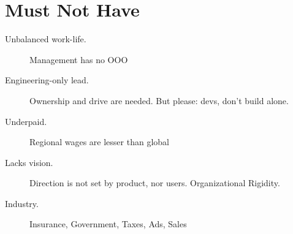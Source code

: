 \documentclass[10pt, a4paper, twocolumn]{article}
\begin{document}


\section*{Must Not Have}

\begin{description}
  \item[Unbalanced work-life.] Management has no OOO
  \item[Engineering-only lead.]
  Ownership and drive are needed.
  But please: %
  devs, don't build alone.
 \item[Underpaid.] Regional wages are lesser than global
 \item[Lacks vision.] Direction is not set by product, nor users. Organizational Rigidity.
  \item[Industry.] Insurance, Government, Taxes, Ads, Sales %
\end{description}



\end{document}
